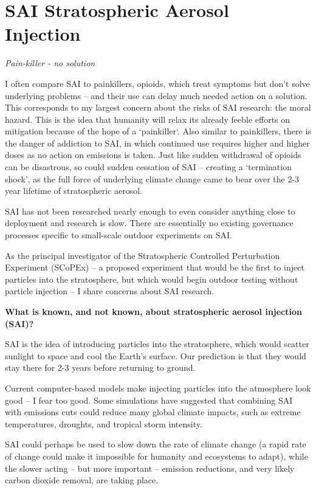 \documentclass[
]{book}
\begin{document}
\hypertarget{sai-stratospheric-aerosol-injection}{%
\chapter{SAI Stratospheric Aerosol Injection}\label{sai-stratospheric-aerosol-injection}}

\emph{Pain-killer - no solution}

I often compare SAI to painkillers, opioids, which treat symptoms but don't solve underlying problems -- and their use can delay much needed action on a solution.
This corresponds to my largest concern about the risks of SAI research: the moral hazard. This is the idea that humanity will relax its already feeble efforts on mitigation because of the hope of a `painkiller`.
Also similar to painkillers, there is the danger of addiction to SAI, in which continued use requires higher and higher doses as no action on emissions is taken. Just like sudden withdrawal of opioids can be disastrous, so could sudden cessation of SAI -- creating a `termination shock', as the full force of underlying climate change came to bear over the 2-3 year lifetime of stratospheric aerosol.

SAI has not been researched nearly enough to even consider anything close to deployment and research is slow. There are essentially no existing governance processes specific to small-scale outdoor experiments on SAI.

As the principal investigator of the Stratospheric Controlled Perturbation Experiment (SCoPEx) -- a proposed experiment that would be the first to inject particles into the stratosphere, but which would begin outdoor testing without particle injection -- I share concerns about SAI research.

\textbf{What is known, and not known, about stratospheric aerosol injection (SAI)?}

SAI is the idea of introducing particles into the stratosphere, which would scatter sunlight to space and cool the Earth's surface. Our prediction is that they would stay there for 2-3 years before returning to ground.

Current computer-based models make injecting particles into the atmosphere look good -- I fear too good. Some simulations have suggested that combining SAI with emissions cuts could reduce many global climate impacts, such as extreme temperatures, droughts, and tropical storm intensity.

SAI could perhaps be used to slow down the rate of climate change (a rapid rate of change could make it impossible for humanity and ecosystems to adapt), while the slower acting -- but more important -- emission reductions, and very likely carbon dioxide removal, are taking place.
\end{document}
